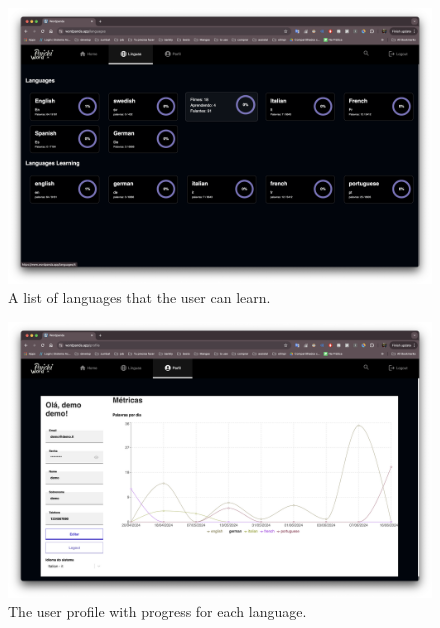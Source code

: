 \documentclass[12pt]{article}
\begin{document}
  \begin{figure}
    \centering
    \caption{
    A list of languages that the user can learn. 
    }
    \label{fig:site2}
    \includegraphics[width=1\textwidth]{assets/21.png}
    \end{figure}

    \begin{figure}
      \centering
      \caption{
      The user profile with progress for each language.
      }
      \label{fig:site3}
      \includegraphics[width=1\textwidth]{assets/22.png}
    \end{figure}
\end{document}
